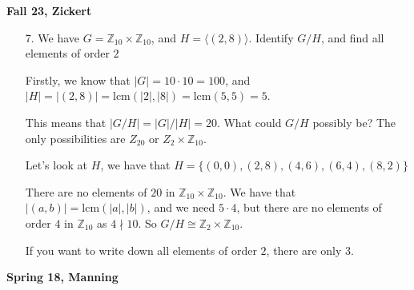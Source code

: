 \documentclass[12pt]{article}
\def\lcm{\text{lcm}}
\def\Z{{\mathbb Z}}
\newcommand{\lr}[1]{\langle #1 \rangle}
\theoremstyle{remark}
\theoremstyle{remark}
\theoremstyle{remark}
\theoremstyle{remark}
\theoremstyle{remark}
\begin{document}
{\bf Fall 23, Zickert}

\begin{enumerate}
  \item[7.] We have $G = \Z_{10} \times \Z_{10}$, and $H = \lr{(2, 8)}$.
    Identify $G / H$, and find all elements of order $2$

    Firstly, we know that $|G| = 10 \cdot 10 = 100$, and $|H| = |(2, 8)| =
    \lcm(|2|, |8|) = \lcm(5, 5) = 5$.

    This means that $|G / H| = |G| / |H| = 20$. What could $G / H$ possibly be?
    The only possibilities are $Z_{20}$ or $Z_{2} \times \Z_{10}$.

    Let's look at $H$, we have that $H = \{(0, 0), (2, 8), (4, 6), (6, 4), (8, 2)\}$

    There are no elements of $20$ in $\Z_{10} \times \Z_{10}$. We have that
    $|(a, b)| = \lcm(|a|, |b|)$, and we need $5 \cdot 4$, but there are no
    elements of order $4$ in $\Z_{10}$ as $4 \nmid 10$. So $G / H \cong \Z_2
    \times \Z_{10}$.

    If you want to write down all elements of order $2$, there are only $3$.
\end{enumerate}

{\bf Spring 18, Manning}
\end{document}
